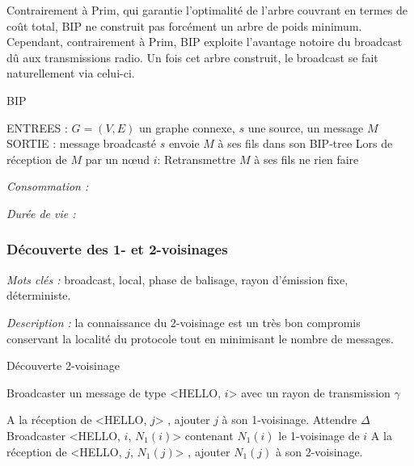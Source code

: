Contrairement à Prim, qui garantie l'optimalité de l'arbre couvrant en termes de coût total,
BIP ne construit pas forcément un arbre de poids minimum. Cependant, contrairement à Prim, BIP exploite l'avantage notoire du broadcast dû aux transmissions radio. Un fois cet arbre construit, le broadcast se fait naturellement via celui-ci.


\begin{algorithm}[h]
\caption{BIP}
\label{algo_BIP}
\begin{algorithmic}
\STATE ENTREES :  $G=(V,E)$ un graphe connexe, $s$ une source, un message $M$
\STATE SORTIE : message broadcasté
\STATE $s$ envoie $M$ à ses fils dans son BIP-tree
\STATE Lors de réception de $M$ par un nœud $i$:
	\STATE Retransmettre $M$ à ses fils
\ELSE
	\STATE ne rien faire
\ENDIF
\end{algorithmic}
\end{algorithm}



\emph{Consommation :} 

\emph{Durée de vie :} 



\subsubsection{Découverte des 1- et 2-voisinages}

\emph{Mots clés :} broadcast, local, phase de balisage, rayon d'émission fixe, déterministe.

\emph{Description :} la connaissance du 2-voisinage est un très bon compromis conservant la localité du protocole tout en minimisant le nombre de messages.


\begin{algorithm}[h]
\caption{Découverte 2-voisinage}
\label{algo_k_voisinage}
\begin{algorithmic}

	\STATE Broadcaster un message de type <HELLO, $i$> avec un rayon de transmission $\gamma$
\ENDFOR

\STATE A la réception de <HELLO, $j$> , ajouter $j$ à son 1-voisinage.
\STATE Attendre $\Delta$
	\STATE Broadcaster <HELLO, $i$, $N_1(i)$> contenant $N_1(i)$ le 1-voisinage de $i$
	\STATE A la réception de <HELLO, $j$, $N_1(j)$> , ajouter $N_1(j)$ à son 2-voisinage.
	
\ENDFOR
\end{algorithmic}
\end{algorithm}

